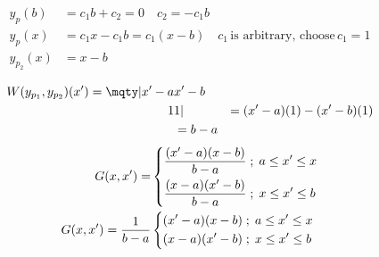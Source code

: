 \documentclass{article}
\begin{document}
{\begin{enumerate}
\begin{equation*}
		\end{equation*}
		\begin{equation*}
			\begin{split}
				y_p(b) &= c_1 b + c_2 = 0 \quad c_2 = -c_1 b \\
				y_p(x) &= c_1 x - c_1 b = c_1(x-b) \quad c_1 \, \text{is arbitrary, choose} \, c_1 = 1 \\
				y_{p_2}(x) &= x - b \\
			\end{split}
		\end{equation*}
		\begin{equation*}
			\begin{split}
				W(y_{p_1} , y_{p_2})(x') =
				\mqty| x'-a & x'-b \\ 
						1   & 1 |
				&= (x'-a)(1) - (x'-b)(1) \\
				&= b - a \\
			\end{split}
		\end{equation*}
		\begin{equation*}
			\begin{split}
				G(x,x') =
				&\begin{dcases}
					\frac{(x' - a) (x - b)}{b - a} \; ; \; a \leq x' \leq x \\
					\frac{(x - a) (x' - b)}{b - a} \; ; \; x \leq x' \leq b
				\end{dcases} \\
				G(x,x') = \frac{1}{b - a}
				&\begin{dcases}
					(x' - a) (x - b) \; ; \; a \leq x' \leq x \\
					(x - a) (x' - b) \; ; \; x \leq x' \leq b
				\end{dcases}
			\end{split}
		\end{equation*}
	

\end{enumerate}}
\end{document}
